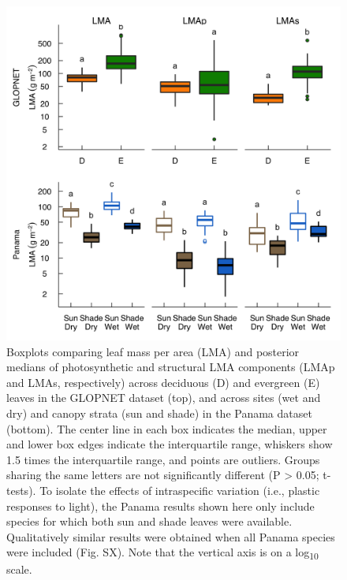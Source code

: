 \documentclass[
  12pt,
  a4paper,
,tablecaptionabove
]{scrartcl}
\begin{document}
\begin{figure}
\hypertarget{fig:boxplt}{%
\centering
\includegraphics{../figs/box_main.png}
\caption{Boxplots comparing leaf mass per area (LMA) and posterior medians of photosynthetic and structural LMA components (LMAp and LMAs, respectively) across deciduous (D) and evergreen (E) leaves in the GLOPNET dataset (top), and across sites (wet and dry) and canopy strata (sun and shade) in the Panama dataset (bottom).
The center line in each box indicates the median, upper and lower box edges indicate the interquartile range, whiskers show 1.5 times the interquartile range, and points are outliers.
Groups sharing the same letters are not significantly different (P \textgreater{} 0.05; t-tests).
To isolate the effects of intraspecific variation (i.e., plastic responses to light), the Panama results shown here only include species for which both sun and shade leaves were available.
Qualitatively similar results were obtained when all Panama species were included (Fig. SX).
Note that the vertical axis is on a log\textsubscript{10} scale.}\label{fig:boxplt}
}
\end{figure}

\newpage
\end{document}
